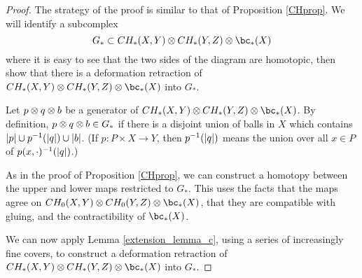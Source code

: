 \begin{proof}
The strategy of the proof is similar to that of Proposition \ref{CHprop}.
We will identify a subcomplex 
\[
	G_* \sub CH_*(X, Y) \ot CH_*(Y, Z) \ot \bc_*(X)
\]
where it is easy to see that the two sides of the diagram are homotopic, then 
show that there is a deformation retraction of $CH_*(X, Y) \ot CH_*(Y, Z) \ot \bc_*(X)$ into $G_*$.

Let $p\otimes q\otimes b$ be a generator of $CH_*(X, Y) \ot CH_*(Y, Z) \ot \bc_*(X)$.
By definition, $p\otimes q\otimes b\in G_*$ if there is a disjoint union of balls in $X$ which
contains $|p| \cup p^{-1}(|q|) \cup |b|$.
(If $p:P\times X\to Y$, then $p^{-1}(|q|)$ means the union over all $x\in P$ of 
$p(x, \cdot)^{-1}(|q|)$.)

As in the proof of Proposition \ref{CHprop}, we can construct a homotopy 
between the upper and lower maps restricted to $G_*$.
This uses the facts that the maps agree on $CH_0(X, Y) \ot CH_0(Y, Z) \ot \bc_*(X)$,
that they are compatible with gluing, and the contractibility of $\bc_*(X)$.

We can now apply Lemma \ref{extension_lemma_c}, using a series of increasingly fine covers, 
to construct a deformation retraction of $CH_*(X, Y) \ot CH_*(Y, Z) \ot \bc_*(X)$ into $G_*$.
\end{proof}

